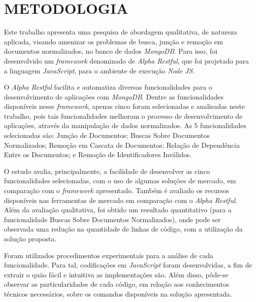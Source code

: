 \chapter{METODOLOGIA}
\label{Metodologia}

Este trabalho apresenta uma pesquisa de abordagem qualitativa, de natureza aplicada, visando amenizar os problemas de busca, junção e remoção em documentos normalizados, no banco de dados \textit{MongoDB}. Para isso, foi desenvolvido um \textit{framework} denominado de \textit{Alpha Restful}, que foi projetado para a linguagem \textit{JavaScript}, para o ambiente de execução \textit{Node JS}.


O \textit{Alpha Restful} facilita e automatiza diversas funcionalidades para o desenvolvimento de aplicações com \textit{MongoDB}. Dentre as funcionalidades disponíveis nesse \textit{framework}, apenas cinco foram selecionadas e analisadas neste trabalho, pois tais funcionalidades melhoram o processo de desenvolvimento de aplicações, através da manipulação de dados normalizados. As 5 funcionalidades selecionadas são: Junção de Documentos; Buscas Sobre Documentos Normalizados; Remoção em Cascata de Documentos; Relação de Dependência Entre os Documentos; e Remoção de Identificadores Inválidos.

O estudo avalia, principalmente, a facilidade de desenvolver as cinco funcionalidades selecionadas, com o uso de algumas soluções de mercado, em comparação com o \textit{framework} apresentado. Também é avaliado os recursos disponíveis nas ferramentas de mercado em comparação com o \textit{Alpha Restful}. Além da avaliação qualitativa, foi obtido um resultado quantitativo (para a funcionalidade Buscas Sobre Documentos Normalizados), onde pode ser observada uma redução na quantidade de linhas de código, com a utilização da solução proposta.

Foram utilizados procedimentos experimentais para a análise de cada funcionalidade. Para tal, codificações em \textit{JavaScript} foram desenvolvidas, a fim de extrair o quão fácil e intuitiva as implementações são. Além disso, pôde-se observar as particularidades de cada código, em relação aos conhecimentos técnicos necessários, sobre os comandos disponíveis na solução apresentada.

